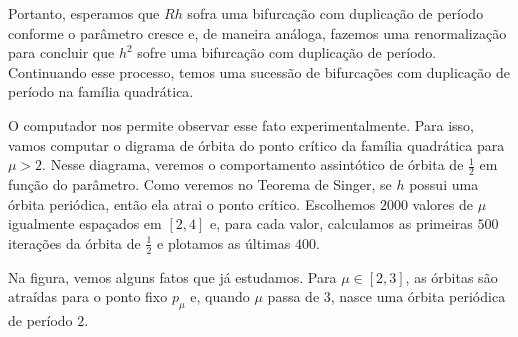 Portanto, esperamos que $Rh$ sofra uma bifurcação com duplicação de período conforme o parâmetro cresce e, de maneira análoga, fazemos uma renormalização para concluir que $h^2$ sofre uma bifurcação com duplicação de período. Continuando esse processo, temos uma sucessão de bifurcações com duplicação de período na família quadrática.

O computador nos permite observar esse fato experimentalmente. Para isso, vamos computar o digrama de órbita do ponto crítico da família quadrática para $\mu > 2$. Nesse diagrama, veremos o comportamento assintótico de órbita de $\frac{1}{2}$ em função do parâmetro. Como veremos no Teorema de Singer, se $h$ possui uma órbita periódica, então ela atrai o ponto crítico. Escolhemos $2000$ valores de $\mu$ igualmente espaçados em $[2, 4]$ e, para cada valor, calculamos as primeiras $500$ iterações da órbita de $\frac{1}{2}$ e plotamos as últimas $400$.

Na figura, vemos alguns fatos que já estudamos. Para $\mu \in [2, 3]$, as órbitas são atraídas para o ponto fixo $p_\mu$ e, quando $\mu$ passa de $3$, nasce uma órbita periódica de período $2$. 